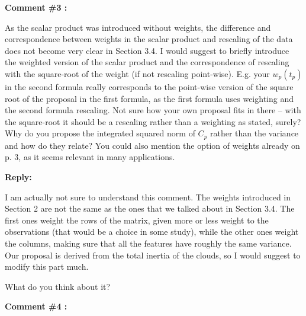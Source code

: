 \documentclass[11pt]{article}
\begin{document}
\itshape


\textbf{Comment \#3 :}

As the scalar product was introduced without weights, the difference and correspondence between weights in the scalar product and rescaling of the data does not become very clear in Section 3.4. I would suggest to briefly introduce the weighted version of the scalar product and the correspondence of rescaling with the square-root of the weight (if not rescaling point-wise). E.g. your $w_p(t_p)$ in the second formula really corresponds to the point-wise version of the square root of the proposal in the first formula, as the first formula uses weighting and the second formula rescaling. Not sure how your own proposal fits in there – with the square-root it should be a rescaling rather than a weighting as stated, surely? Why do you propose the integrated squared norm of $C_p$ rather than the variance and how do they relate? You could also mention the option of weights already on p. 3, as it seems relevant in many applications.


\medskip

\normalfont

\textbf{Reply:}

I am actually not sure to understand this comment. The weights introduced in Section 2 are not the same as the ones that we talked about in Section 3.4. The first ones weight the rows of the matrix, given more or less weight to the observations (that would be a choice in some study), while the other ones weight the columns, making sure that all the features have roughly the same variance. Our proposal is derived from the total inertia of the clouds, so I would suggest to modify this part much. 

What do you think about it?

\bigskip


\itshape


\textbf{Comment \#4 :}
\end{document}
